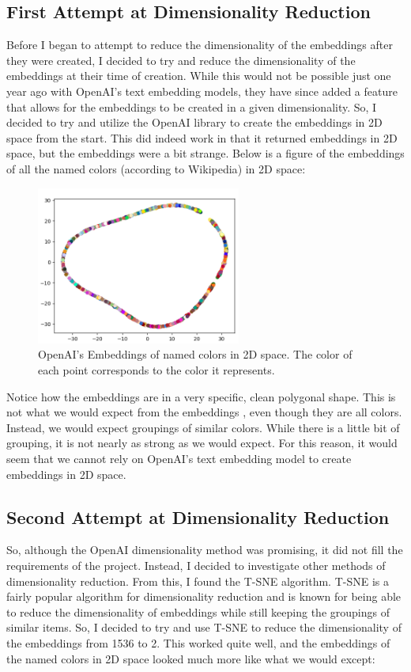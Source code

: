 \documentclass{article}
\begin{document}
\subsection{First Attempt at Dimensionality Reduction}
Before I began to attempt to reduce the dimensionality of the embeddings 
after they were created, I decided to try and reduce the dimensionality 
of the embeddings at their time of creation. While this would not be possible
just one year ago with OpenAI's text embedding models, they have since added
a feature that allows for the embeddings to be created in a given dimensionality.
So, I decided to try and utilize the OpenAI library to create the embeddings in 
2D space from the start. This did indeed work in that it returned embeddings in 2D space,
but the embeddings were a bit strange. Below is a figure of the embeddings of all the named
colors (according to Wikipedia\cite{wikipediaColors}) in 2D space:

\begin{figure}[H]
\centering
\includegraphics[width=0.6\textwidth]{images/openai_2d_embeddings.png}
\caption{OpenAI's Embeddings of named colors in 2D space. The color of each point corresponds to the color it represents.}
\label{fig:openai2dembeddings}
\end{figure}

\noindent
Notice how the embeddings are in a very specific, clean polygonal shape. This is not what we would expect from the embeddings
, even though they are all colors. Instead, we would expect groupings of similar colors. While there is a little
bit of grouping, it is not nearly as strong as we would expect. For this reason, it would seem that we cannot rely on
OpenAI's text embedding model to create embeddings in 2D space.
\newline

\subsection{Second Attempt at Dimensionality Reduction}
So, although the OpenAI dimensionality method was promising, it did not fill the requirements
of the project. Instead, I decided to investigate other methods of dimensionality reduction.
From this, I found the T-SNE algorithm. T-SNE is a fairly popular algorithm for dimensionality reduction
and is known for being able to reduce the dimensionality of embeddings while still keeping the
groupings of similar items. So, I decided to try and use T-SNE to reduce the dimensionality of the
embeddings from 1536 to 2. This worked quite well, and the embeddings of the named colors in 2D space
looked much more like what we would except:
\end{document}
